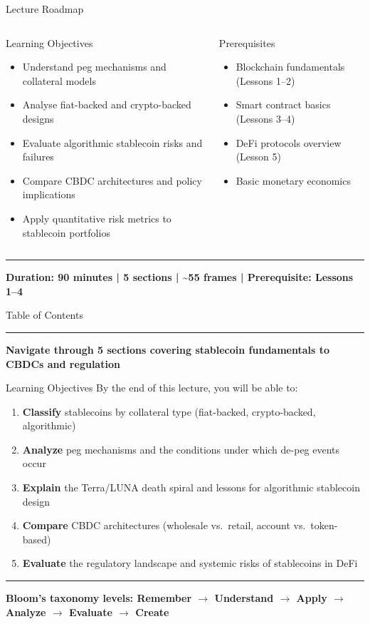 \documentclass[8pt,aspectratio=169]{beamer}
\newcommand{\bottomnote}[1]{\vfill\vspace{-2mm}\textcolor{mllavender2}{\rule{\textwidth}{0.4pt}}\vspace{1mm}\footnotesize\textbf{#1}}
\begin{document}
\begin{frame}{Lecture Roadmap}
\vspace{3mm}
\begin{columns}[T]
\begin{block}{Learning Objectives}
\begin{itemize}\setlength{\itemsep}{1pt}
  \item Understand peg mechanisms and collateral models
  \item Analyse fiat-backed and crypto-backed designs
  \item Evaluate algorithmic stablecoin risks and failures
  \item Compare CBDC architectures and policy implications
  \item Apply quantitative risk metrics to stablecoin portfolios
\end{itemize}
\end{block}
\begin{block}{Prerequisites}
\begin{itemize}\setlength{\itemsep}{1pt}
  \item Blockchain fundamentals (Lessons 1--2)
  \item Smart contract basics (Lessons 3--4)
  \item DeFi protocols overview (Lesson 5)
  \item Basic monetary economics
\end{itemize}
\end{block}
\end{columns}
\bottomnote{Duration: 90 minutes | 5 sections | \textasciitilde55 frames | Prerequisite: Lessons 1--4}
\end{frame}

\begin{frame}{Table of Contents}
\tableofcontents
\bottomnote{Navigate through 5 sections covering stablecoin fundamentals to CBDCs and regulation}
\end{frame}

\begin{frame}{Learning Objectives}
By the end of this lecture, you will be able to:
\begin{enumerate}
\item \textbf{Classify} stablecoins by collateral type (fiat-backed, crypto-backed, algorithmic)
\item \textbf{Analyze} peg mechanisms and the conditions under which de-peg events occur
\item \textbf{Explain} the Terra/LUNA death spiral and lessons for algorithmic stablecoin design
\item \textbf{Compare} CBDC architectures (wholesale vs.\ retail, account vs.\ token-based)
\item \textbf{Evaluate} the regulatory landscape and systemic risks of stablecoins in DeFi
\end{enumerate}
\bottomnote{Bloom's taxonomy levels: Remember $\rightarrow$ Understand $\rightarrow$ Apply $\rightarrow$ Analyze $\rightarrow$ Evaluate $\rightarrow$ Create}
\end{frame}
\end{document}
